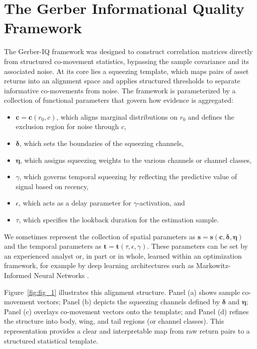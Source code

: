 \documentclass[12pt,letterpaper]{article}
\begin{document}
\section{The Gerber Informational Quality Framework}

The Gerber-IQ framework was designed to construct correlation matrices directly from structured co-movement statistics, bypassing the sample covariance and its associated noise. At its core lies a squeezing template, which maps pairs of asset returns into an alignment space and applies structured thresholds to separate informative co-movements from noise. The framework is parameterized by a collection of functional parameters that govern how evidence is aggregated:  
\begin{itemize}
    \item $\mathbf{c}=\mathbf{c}(r_0, c)$, which aligns marginal distributions on $r_0$ and defines the exclusion region for noise through $c$,  
    \item $\boldsymbol\delta$, which sets the boundaries of the squeezing channels,  
    \item $\boldsymbol\eta$, which assigns squeezing weights to the various channels or channel classes,  
    \item $\gamma$, which governs temporal squeezing by reflecting the predictive value of signal based on recency,  
    \item $\epsilon$, which acts as a delay parameter for $\gamma$-activation, and  
    \item $\tau$, which specifies the lookback duration for the estimation sample.  
\end{itemize}

We sometimes represent the collection of spatial parameters as $\mathbf{s}=\mathbf{s}(\mathbf{c},\boldsymbol{\delta},\boldsymbol{\eta})$ and the temporal parameters as $\mathbf{t}=\mathbf{t}(\tau,\epsilon,\gamma)$.
These parameters can be set by an experienced analyst or, in part or in whole, learned within an optimization framework, for example by deep learning architectures such as Markowitz-Informed Neural Networks \citep{minns2025ssrn}.  

Figure~\ref{fig:fig_1} illustrates this alignment structure.  
Panel (a) shows sample co-movement vectors; Panel (b) depicts the squeezing channels defined by $\boldsymbol{\delta}$ and $\boldsymbol{\eta}$; Panel (c) overlays co-movement vectors 
onto the template; and Panel (d) refines the structure into body, wing, and tail regions (or channel classes). This representation provides a clear and interpretable map from raw return pairs to a 
structured statistical template. 
\end{document}
